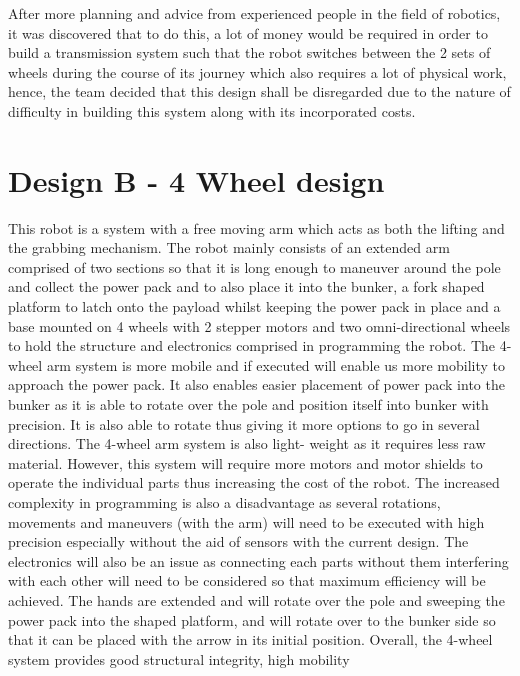 \documentclass[12pt]{report}
\begin{document}
After more planning and advice from experienced people in the field of robotics, it was discovered that to do this, a lot of money would be required in order to build a transmission system such that the robot switches between the 2 sets of wheels during the course of its journey which also requires a lot of physical work, hence, the team decided that this design shall be disregarded due to the nature of difficulty in building this system along with its incorporated costs.


\section{Design B - 4 Wheel design}
This robot is a system with a free moving arm which acts as both the lifting and the grabbing
mechanism. The robot mainly consists of an extended arm comprised of two sections so that it is
long enough to maneuver around the pole and collect the power pack and to also place it into the
bunker, a fork shaped platform to latch onto the payload whilst keeping the power pack in place
and a base mounted on 4 wheels with 2 stepper motors and two omni-directional wheels to hold
the structure and electronics comprised in programming the robot.
The 4-wheel arm system is more mobile and if executed will enable us more mobility to
approach the power pack. It also enables easier placement of power pack into the bunker as it is
able to rotate over the pole and position itself into bunker with precision. It is also able to rotate
thus giving it more options to go in several directions. The 4-wheel arm system is also light-
weight as it requires less raw material. However, this system will require more motors and motor
shields to operate the individual parts thus increasing the cost of the robot. The increased
complexity in programming is also a disadvantage as several rotations, movements and
maneuvers (with the arm) will need to be executed with high precision especially without the aid
of sensors with the current design. The electronics will also be an issue as connecting each parts
without them interfering with each other will need to be considered so that maximum efficiency
will be achieved.
The hands are extended and will rotate over the pole and sweeping the power pack into the
shaped platform, and will rotate over to the bunker side so that it can be placed with the arrow in
its initial position. Overall, the 4-wheel system provides good structural integrity, high mobility
\end{document}
